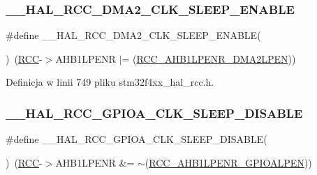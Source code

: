 \subsubsection{\texorpdfstring{\+\_\+\+\_\+\+H\+A\+L\+\_\+\+R\+C\+C\+\_\+\+D\+M\+A2\+\_\+\+C\+L\+K\+\_\+\+S\+L\+E\+E\+P\+\_\+\+E\+N\+A\+B\+LE}{\_\_HAL\_RCC\_DMA2\_CLK\_SLEEP\_ENABLE}}
{\footnotesize\ttfamily \#define \+\_\+\+\_\+\+H\+A\+L\+\_\+\+R\+C\+C\+\_\+\+D\+M\+A2\+\_\+\+C\+L\+K\+\_\+\+S\+L\+E\+E\+P\+\_\+\+E\+N\+A\+B\+LE(\begin{DoxyParamCaption}{ }\end{DoxyParamCaption})~(\hyperlink{group___peripheral__declaration_ga74944438a086975793d26ae48d5882d4}{R\+CC}-\/$>$A\+H\+B1\+L\+P\+E\+NR $\vert$= (\hyperlink{group___peripheral___registers___bits___definition_ga9e2d376f6c7db4266a5b039a3aa6c207}{R\+C\+C\+\_\+\+A\+H\+B1\+L\+P\+E\+N\+R\+\_\+\+D\+M\+A2\+L\+P\+EN}))}



Definicja w linii 749 pliku stm32f4xx\+\_\+hal\+\_\+rcc.\+h.

\mbox{\label{group___r_c_c___a_h_b1___low_power___enable___disable_gad6753edbd9047eeac39ae4f234642942}} 
\subsubsection{\texorpdfstring{\+\_\+\+\_\+\+H\+A\+L\+\_\+\+R\+C\+C\+\_\+\+G\+P\+I\+O\+A\+\_\+\+C\+L\+K\+\_\+\+S\+L\+E\+E\+P\+\_\+\+D\+I\+S\+A\+B\+LE}{\_\_HAL\_RCC\_GPIOA\_CLK\_SLEEP\_DISABLE}}
{\footnotesize\ttfamily \#define \+\_\+\+\_\+\+H\+A\+L\+\_\+\+R\+C\+C\+\_\+\+G\+P\+I\+O\+A\+\_\+\+C\+L\+K\+\_\+\+S\+L\+E\+E\+P\+\_\+\+D\+I\+S\+A\+B\+LE(\begin{DoxyParamCaption}{ }\end{DoxyParamCaption})~(\hyperlink{group___peripheral__declaration_ga74944438a086975793d26ae48d5882d4}{R\+CC}-\/$>$A\+H\+B1\+L\+P\+E\+NR \&= $\sim$(\hyperlink{group___peripheral___registers___bits___definition_gaf1076b0644c026ab480efdb6aa8c74fb}{R\+C\+C\+\_\+\+A\+H\+B1\+L\+P\+E\+N\+R\+\_\+\+G\+P\+I\+O\+A\+L\+P\+EN}))}



